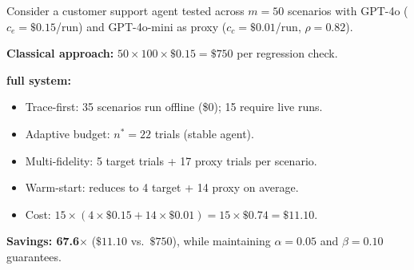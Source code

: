 \begin{example}
\label{ex:cost-comparison}
Consider a customer support agent tested across $m = 50$ scenarios with
GPT-4o ($c_e = \$0.15$/run) and GPT-4o-mini as proxy
($c_c = \$0.01$/run, $\rho = 0.82$).

\noindent\textbf{Classical approach:} $50 \times 100 \times \$0.15 =
\$750$ per regression check.

\noindent\textbf{\agentassay{} full system:}
\begin{itemize}[leftmargin=*]
  \item Trace-first: 35 scenarios run offline (\$0); 15 require
    live runs.
  \item Adaptive budget: $n^* = 22$ trials (stable agent).
  \item Multi-fidelity: 5 target trials + 17 proxy trials per
    scenario.
  \item Warm-start: reduces to 4 target + 14 proxy on average.
  \item Cost: $15 \times (4 \times \$0.15 + 14 \times \$0.01) =
    15 \times \$0.74 = \$11.10$.
\end{itemize}
\textbf{Savings: 67.6$\times$} ($\$11.10$ vs.\ $\$750$), while
maintaining $\alpha = 0.05$ and $\beta = 0.10$ guarantees.
\end{example}
